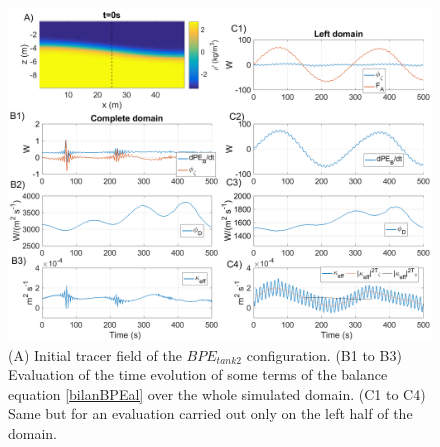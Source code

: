\begin{figure}[h!]
\centering
\includegraphics[width=1\textwidth]{./CHAP_BPE/Fig_TANK_pyc.png}
\caption[Initial tracer field and evaluation of $\kappa_{eff}$ for configuration $BPE_{tank2}$]{(A) Initial tracer field of the $BPE_{tank2}$ configuration. (B1 to B3) Evaluation of the time evolution of some terms of the balance equation \ref{bilanBPEal} over the whole simulated domain. (C1 to C4) Same but for an evaluation carried out only on the left half of the domain.}
\label{figCpsin}
\end{figure}
